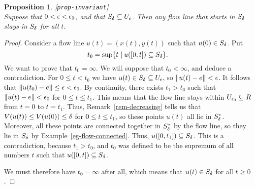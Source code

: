\documentclass[reqno]{amsart}
\newcommand{\lbl}[1]{\label{#1}\textup{[\texttt{#1}]}\ \\}
\newcommand{\lbl}{\label}
\newtheorem{proposition}[theorem]{Proposition}
\theoremstyle{definition}
\begin{document}
\begin{proposition}\lbl{prop-invariant}
 Suppose that $0<\epsilon<\epsilon_0$, and that $S_\delta\subseteq U_\epsilon$.  Then any
 flow line that starts in $S_\delta$ stays in $S_\delta$ for all $t$.
\end{proposition}
\begin{proof}
 Consider a flow line $u(t)=(x(t),y(t))$ such that $u(0)\in S_\delta$.
 Put 
 \[ t_0=\sup\{t\;|\; u([0,t])\subseteq S_\delta\}. \]
 We want to prove that $t_0=\infty$.  We will suppose that
 $t_0<\infty$, and deduce a contradiction.  For $0\leq t<t_0$ we have
 $u(t)\in S_\delta\subseteq U_\epsilon$, so $\|u(t)-e\|<\epsilon$.  It follows that
 $\|u(t_0)-e\|\leq\epsilon<\epsilon_0$.  By continuity, there exists $t_1>t_0$
 such that $\|u(t)-e\|<\epsilon_0$ for $0\leq t\leq t_1$.  This means that
 the flow line stays within $U_{\epsilon_0}\subseteq R$ from $t=0$ to $t=t_1$.
 Thus, Remark~\ref{rem-decreasing} tells us that
 $V(u(t))\leq V(u(0))\leq\delta$ for $0\leq t\leq t_1$, so these points
 $u(t)$ all lie in $S_\delta^*$.  Moreover, all these points are
 connected together in $S_\delta^*$ by the flow line, so they lie in
 $S_\delta$ by Example~\ref{eg-flow-connected}.  Thus,
 $u([0,t_1])\subseteq S_\delta$.  This is a contradiction, because $t_1>t_0$,
 and $t_0$ was defined to be the supremum of all numbers $t$ such that
 $u([0,t])\subseteq S_\delta$.

 We must therefore have $t_0=\infty$ after all, which means that
 $u(t)\in S_\delta$ for all $t\geq 0$. 
\end{proof}
\end{document}
